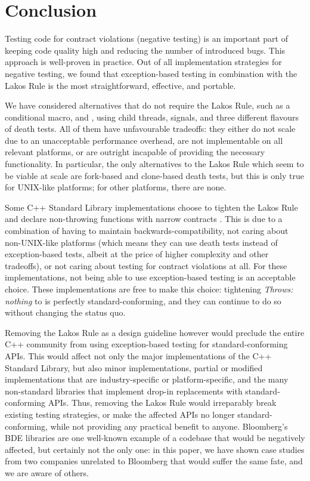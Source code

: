\section{Conclusion}

Testing code for contract violations (negative testing) is an important part of keeping code quality high and reducing the number of introduced bugs. This approach is well-proven in practice. Out of all implementation strategies for negative testing, we found that exception-based testing in combination with the Lakos Rule is the most straightforward, effective, and portable.

We have considered alternatives that do not require the Lakos Rule, such as a conditional  macro,  and , using child threads, signals, and three different flavours of death tests. All of them have unfavourable tradeoffs: they either do not scale due to an unacceptable performance overhead, are not implementable on all relevant platforms, or are outright incapable of providing the necessary functionality. In particular, the only alternatives to the Lakos Rule which seem to be viable at scale are fork-based and clone-based death tests, but this is only true for UNIX-like platforms; for other platforms, there are none.

Some C++ Standard Library implementations choose to tighten the Lakos Rule and declare non-throwing functions with narrow contracts . This is due to a combination of having to maintain backwards-compatibility, not caring about non-UNIX-like platforms (which means they can use death tests instead of exception-based tests, albeit at the price of higher complexity and other tradeoffs), or not caring about testing for contract violations at all. For these implementations, not being able to use exception-based testing is an acceptable choice. These implementations are free to make this choice: tightening \emph{Throws: nothing} to  is perfectly standard-conforming, and they can continue to do so without changing the status quo.

Removing the Lakos Rule as a design guideline however would preclude the entire C++ community from using exception-based testing for standard-conforming APIs. This would affect not only the major implementations of the C++ Standard Library, but also minor implementations, partial or modified implementations that are industry-specific or platform-specific, and the many non-standard libraries that implement drop-in replacements with standard-conforming APIs. Thus, removing the Lakos Rule would irreparably break existing testing strategies, or make the affected APIs no longer standard-conforming, while not providing any practical benefit to anyone. Bloomberg's BDE libraries are one well-known example of a codebase that would be negatively affected, but certainly not the only one: in this paper, we have shown case studies from two companies unrelated to Bloomberg that would suffer the same fate, and we are aware of others.

